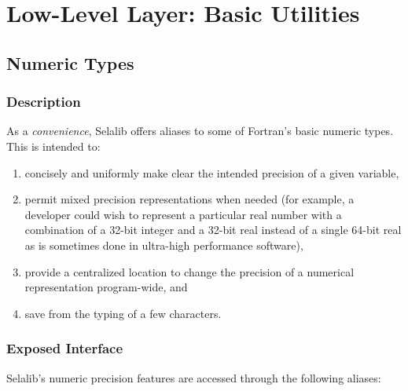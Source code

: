 \documentclass[]{report}   %
\begin{document}

\chapter{Low-Level Layer: Basic Utilities}           %


\section{Numeric Types}     %
\subsection{Description}
As a \emph{convenience}, Selalib offers aliases to some of Fortran's basic numeric types. This is intended to:
\begin{enumerate}
\item concisely and uniformly make clear the intended precision of a given variable, 
\item permit mixed precision representations when needed (for example, a developer could wish to represent a particular real number with a combination of a 32-bit integer and a 32-bit real instead of a single 64-bit real as is sometimes done in ultra-high performance software), 
\item provide a centralized location to change the precision of a numerical representation program-wide, and
\item save from the typing of a few characters.
\end{enumerate}

\subsection{Exposed Interface}         %
Selalib's numeric precision features are accessed through the following aliases:
\end{document}
